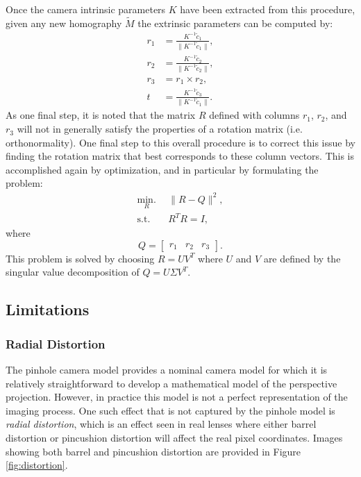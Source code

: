 Once the camera intrinsic parameters $K$ have been extracted from this procedure, given any new homography $\tilde{M}$ the extrinsic parameters can be computed by:
\begin{equation}
\begin{split}
    r_1 &= \frac{K^{-1}\tilde{c}_1}{\lVert K^{-1}\tilde{c}_1 \rVert}, \\
    r_2 &= \frac{K^{-1}\tilde{c}_2}{\lVert K^{-1}\tilde{c}_2 \rVert}, \\
    r_3 &= r_1 \times r_2, \\
    t &= \frac{K^{-1}\tilde{c}_3}{\lVert K^{-1}\tilde{c}_1 \rVert}.
\end{split}
\end{equation}
As one final step, it is noted that the matrix $R$ defined with columns $r_1$, $r_2$, and $r_3$ will not in generally satisfy the properties of a rotation matrix (i.e. orthonormality). One final step to this overall procedure is to correct this issue by finding the rotation matrix that best corresponds to these column vectors. This is accomplished again by optimization, and in particular by formulating the problem:
\begin{equation} \label{eq:Ropt}
\begin{split}
\underset{R}{\text{min.}} \:\:& \lVert R - Q \rVert^2, \\
    \text{s.t.}\:\:& R^TR = I,
\end{split}
\end{equation}
where
\begin{equation*}
    Q = \begin{bmatrix}
        r_1 & r_2 & r_3
    \end{bmatrix}.
\end{equation*}
This problem is solved by choosing $R = UV^T$ where $U$ and $V$ are defined by the singular value decomposition of $Q = U\Sigma V^T$.

\subsection{Limitations}

\subsubsection{Radial Distortion}
The pinhole camera model provides a nominal camera model for which it is relatively straightforward to develop a mathematical model of the perspective projection. However, in practice this model is not a perfect representation of the imaging process. One such effect that is not captured by the pinhole model is \textit{radial distortion}, which is an effect seen in real lenses where either barrel distortion or pincushion distortion will affect the real pixel coordinates. Images showing both barrel and pincushion distortion are provided in Figure \ref{fig:distortion}.

